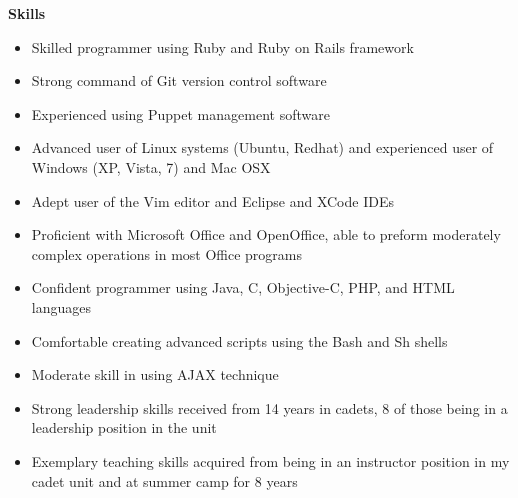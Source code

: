 \documentclass[letterpaper,11pt]{article}
\newcommand{\resheading}[1]{{\large \colorbox{mygrey}{\begin{minipage}{\textwidth}{\textbf{#1 \vphantom{p\^{E}} }}\end{minipage}} }}
\begin{document}
\resheading{{Skills}} %
    \begin{itemize}
        \item Skilled programmer using Ruby and Ruby on Rails framework
        \item Strong command of Git version control software
        \item Experienced using Puppet management software
        \item Advanced user of Linux systems (Ubuntu, Redhat) and experienced user of Windows (XP, Vista, 7) and Mac OSX
        \item Adept user of the Vim editor and Eclipse and XCode IDEs
        \item Proficient with Microsoft Office and OpenOffice, able to preform moderately complex operations in most Office programs
        \item Confident programmer using Java, C, Objective-C, PHP, and HTML languages
        \item Comfortable creating advanced scripts using the Bash and Sh shells
        \item Moderate skill in using AJAX technique
        \item Strong leadership skills received from 14 years in cadets, 8 of those being in a leadership position in the unit
        \item Exemplary teaching skills acquired from being in an instructor position in my cadet unit and at summer camp for 8 years
    \end{itemize}

\end{document}
